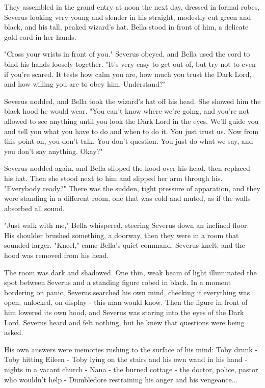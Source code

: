 They assembled in the grand entry at noon the next day, dressed in formal robes, Severus looking very young and slender in his straight, modestly cut green and black, and his tall, peaked wizard's hat. Bella stood in front of him, a delicate gold cord in her hands.

"Cross your wrists in front of you." Severus obeyed, and Bella used the cord to bind his hands loosely together. "It's very easy to get out of, but try not to even if you're scared. It tests how calm you are, how much you trust the Dark Lord, and how willing you are to obey him. Understand?"

Severus nodded, and Bella took the wizard's hat off his head. She showed him the black hood he would wear. "You can't know where we're going, and you're not allowed to see anything until you look the Dark Lord in the eyes. We'll guide you and tell you what you have to do and when to do it. You just trust us. Now from this point on, you don't talk. You don't question. You just do what we say, and you don't say anything. Okay?"

Severus nodded again, and Bella slipped the hood over his head, then replaced his hat. Then she stood next to him and slipped her arm through his. "Everybody ready?" There was the sudden, tight pressure of apparation, and they were standing in a different room, one that was cold and muted, as if the walls absorbed all sound.

"Just walk with me," Bella whispered, steering Severus down an inclined floor. His shoulder brushed something, a doorway, then they were in a room that sounded larger. "Kneel," came Bella's quiet command. Severus knelt, and the hood was removed from his head.

The room was dark and shadowed. One thin, weak beam of light illuminated the spot between Severus and a standing figure robed in black. In a moment bordering on panic, Severus searched his own mind, checking if everything was open, unlocked, on display - this man would know. Then the figure in front of him lowered its own hood, and Severus was staring into the eyes of the Dark Lord. Severus heard and felt nothing, but he knew that questions were being asked.

His own answers were memories rushing to the surface of his mind: Toby drunk - Toby hitting Eileen - Toby lying on the stairs and his own wand in his hand - nights in a vacant church - Nana - the burned cottage - the doctor, police, pastor who wouldn't help - Dumbledore restraining his anger and his vengeance...

